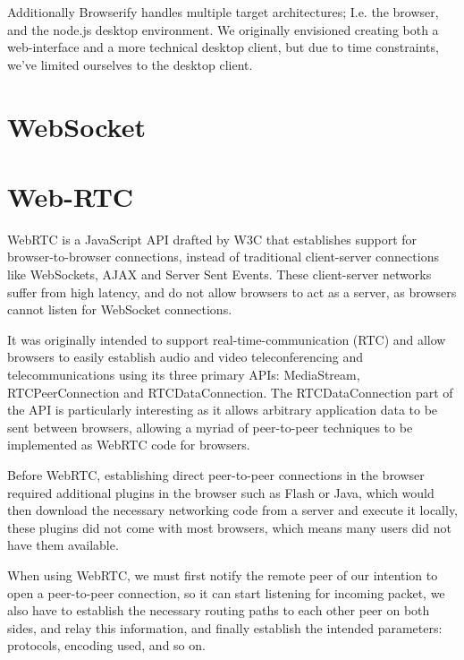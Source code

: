 Additionally Browserify handles multiple target architectures; I.e. the browser,
and the node.js desktop environment. We originally envisioned creating both a 
web-interface and a more technical desktop client, but due to time constraints,
we've limited ourselves to the desktop client.

\section{WebSocket}


\section{Web-RTC}
WebRTC is a JavaScript \acs{API} drafted by W3C that establishes support for browser-to-browser connections,
instead of traditional client-server connections like WebSockets, AJAX and Server Sent Events.
These client-server networks suffer from high latency, and do not allow browsers to act as a server,
as browsers cannot listen for WebSocket connections.

It was originally intended to support real-time-communication (RTC) 
and allow browsers to easily establish audio and video teleconferencing and telecommunications
using its three primary \acs{API}s: MediaStream, RTCPeerConnection and RTCDataConnection.
The RTCDataConnection part of the \acs{API} is particularly interesting
as it allows arbitrary application data to be sent between browsers,
allowing a myriad of peer-to-peer techniques to be implemented as WebRTC code for browsers.

Before WebRTC, establishing direct peer-to-peer connections in the browser required
additional plugins in the browser such as Flash or Java, which would then download the necessary networking code
from a server and execute it locally,
these plugins did not come with most browsers,
which means many users did not have them available.
\newline

\label{webrtc-connection-server}
When using WebRTC, we must first notify the remote peer of our intention
to open a peer-to-peer connection, so it can start listening for incoming packet,
we also have to establish the necessary routing paths to each other peer on both sides,
and relay this information,
and finally establish the intended parameters: protocols, encoding used, and so on.

